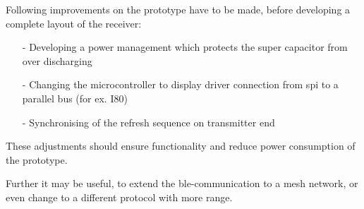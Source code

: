 Following improvements on the prototype have to be made, before developing a complete layout of the receiver:
\begin{itemize}
	\item[-] Developing a power management which protects the super capacitor from over discharging
	\item[-] Changing the microcontroller to display driver connection from \acs{spi} to a parallel bus (for ex. I80)
	\item[-] Synchronising of the refresh sequence on transmitter end
\end{itemize}
These adjustments should ensure functionality and reduce power consumption of the prototype.

Further it may be useful, to extend the \acs{ble}-communication to a mesh network, or even change to a different protocol with more range.





